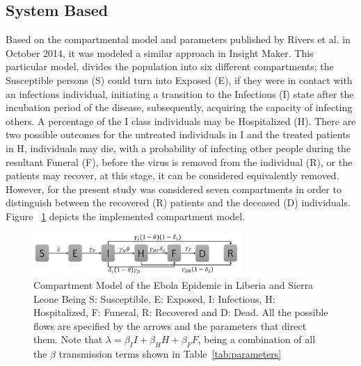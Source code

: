 \documentclass[10pt]{article}
\begin{document}
\subsection{System Based}
Based on the compartmental model and parameters published by Rivers et al.\cite{Rivers2014} in October 2014, it was modeled a similar approach in Insight Maker.  This particular model, divides the population into six different compartments; the Susceptible persons (S) could turn into Exposed (E), if they were in contact with an infections individual, initiating a transition to the Infectious (I) state after the incubation period of the disease, subsequently, acquiring the capacity of infecting others. A percentage of the I class individuals may be Hospitalized (H). There are two possible outcomes for the untreated individuals in I and the treated patients in H, individuals may die, with a probability of infecting other people during the resultant Funeral (F), before the virus is removed from the individual (R), or the patients may recover, at this stage, it can be considered equivalently removed. However, for the present study was considered seven compartments in order to distinguish between the recovered (R) patients and the deceased (D) individuals. Figure ~\ref{fig:compartment} depicts the implemented compartment model. \\

\begin{figure}[h!]
  \centering
  \includegraphics[width=0.7\textwidth]{compartment}
  \caption{Compartment Model of the Ebola Epidemic in Liberia and Sierra Leone \newline  Being S: Susceptible, E: Exposed, I: Infectious, H: Hospitalized, F: Funeral,  R: Recovered and D: Dead. All the possible flows are specified by the arrows and the parameters that direct them. Note that $\lambda = \beta_{I}I+\beta_{H}H+\beta_{F}F $, being a combination of all the $\beta$ transmission terms shown in Table~\ref{tab:parameters}} 
\label{fig:compartment} 
\end{figure}
\end{document}
